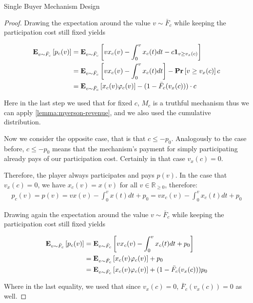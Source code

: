 \documentclass[11pt,a4paper]{article}
\newcommand{\RR}{\ensuremath{\mathbb{R}}}
\renewcommand{\Pr}[1]{\mbox{\rm\bf Pr}\left[#1\right]}
\newcommand{\Ex}[2][]{\mbox{\rm\bf E}_{#1}\left[#2\right]}
\newcommand{\1}[1]{\mbox{\rm\bf 1}_{#1}}
\begin{document}
\begin{section}{Single Buyer Mechanism Design}
\begin{proof}
     Drawing the expectation around the value $v \sim \bar{F}_c$ while keeping the participation cost still fixed yields

     \begin{align*}
         \Ex[v \sim \bar{F}_c]{p_c(v)} & = \Ex[v \sim \bar{F}_c]{v x_c(v) - \int_0^v x_c(t) dt - c \1{v \geq v_x(c)}}   \\
                                       & = \Ex[v \sim \bar{F}_c]{v x_c(v) - \int_0^v x_c(t) dt} - \Pr{v \geq v_x(c)}c   \\
                                       & = \Ex[v \sim \bar{F}_c]{x_c(v) \varphi_c(v)} - (1 - \bar{F}_c(v_x(c))) \cdot c \\
     \end{align*}

     Here in the last step we used that for fixed $c$, $M_c$ is a truthful mechanism thus we can apply \autoref{lemma:myerson-revenue}, and we also used the cumulative distribution.

     Now we consider the opposite case, that is that $c \leq -p_0$.
     Analogously to the case before, $c \leq -p_0$ means that the mechanism's payment for simply participating already pays of our participation cost.
     Certainly in that case $v_x(c) = 0$.

     Therefore, the player always participates and pays $p(v)$. In the case that $v_x(c) = 0$, we have $x_c(v) = x(v)$ for all $v \in \RR_{\geq 0}$, therefore:
     \begin{align*}
         p_c(v) = p(v) = v x(v) - \int_0^v x(t)dt + p_0 = v x_c(v) - \int_0^v x_c(t)dt + p_0
     \end{align*}

     Drawing again the expectation around the value $v \sim \bar{F}_c$ while keeping the participation cost still fixed yields


     \begin{align*}
         \Ex[v \sim \bar{F}_c]{p_c(v)} & = \Ex[v \sim \bar{F}_c]{v x_c(v) - \int_0^v x_c(t)dt + p_0}                  \\
                                       & = \Ex[v \sim \bar{F}_c]{x_c(v) \varphi_c(v)} + p_0                           \\
                                       & = \Ex[v \sim \bar{F}_c]{x_c(v) \varphi_c(v)} + (1 - \bar{F}_{c}(v_x(c))) p_0
     \end{align*}

     Where in the last equality, we used that since $v_x(c) = 0$, $\bar{F}_{c}(v_x(c)) = 0$ as well.


\end{proof}
\end{section}
\end{document}
